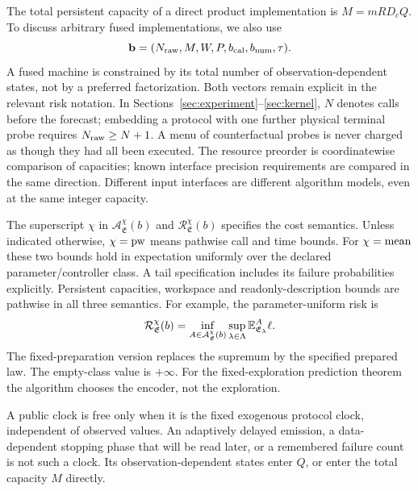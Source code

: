 The total persistent capacity of a direct product implementation is $M=mRD_cQ$. To discuss arbitrary fused implementations, we also use
\begin{equation}\label{eq:total-budget}
 \mathbf b=(N_{\rm raw},M,W,P,b_{\rm cal},b_{\rm num},\tau).
\end{equation}
A fused machine is constrained by its total number of observation-dependent states, not by a preferred factorization. Both vectors remain explicit in the relevant risk notation. In Sections~\ref{sec:experiment}--\ref{sec:kernel}, $N$ denotes calls before the forecast; embedding a protocol with one further physical terminal probe requires $N_{\rm raw}\ge N+1$. A menu of counterfactual probes is never charged as though they had all been executed. The resource preorder is coordinatewise comparison of capacities; known interface precision requirements are compared in the same direction. Different input interfaces are different algorithm models, even at the same integer capacity.

The superscript $\chi$ in $\mathcal A^\chi_{\mathfrak E}(b)$ and $\mathcal R^\chi_{\mathfrak E}(b)$ specifies the cost semantics. Unless indicated otherwise, $\chi={\rm pw}$ means pathwise call and time bounds. For $\chi={\rm mean}$ these two bounds hold in expectation uniformly over the declared parameter/controller class. A tail specification includes its failure probabilities explicitly. Persistent capacities, workspace and readonly-description bounds are pathwise in all three semantics. For example, the parameter-uniform risk is
\[
 \mathcal R^\chi_{\mathfrak E}(b)
   =\inf_{A\in\mathcal A^\chi_{\mathfrak E}(b)}
       \sup_{\lambda\in\Lambda}\mathbb E^{A}_{\mathfrak E_\lambda}\ell.
\]
The fixed-preparation version replaces the supremum by the specified prepared law. The empty-class value is $+\infty$. For the fixed-exploration prediction theorem the algorithm chooses the encoder, not the exploration.

A public clock is free only when it is the fixed exogenous protocol clock, independent of observed values. An adaptively delayed emission, a data-dependent stopping phase that will be read later, or a remembered failure count is not such a clock. Its observation-dependent states enter $Q$, or enter the total capacity $M$ directly.

